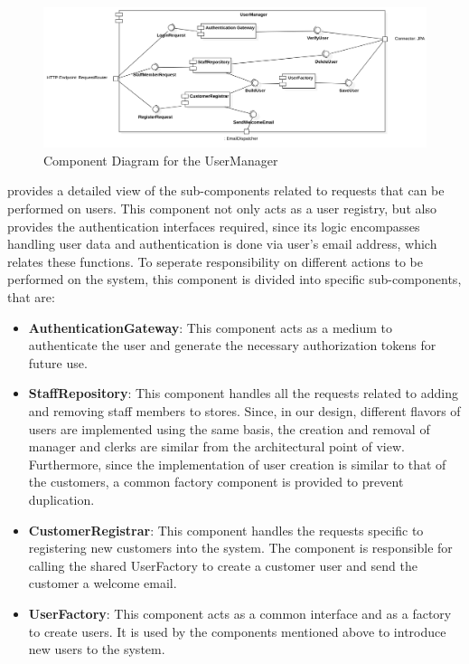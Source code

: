 \begin{figure}[H]
\centering
\includegraphics[height=0.4\textwidth]{Images/ComponentDiagrams/UserManager.png}
\caption{Component Diagram for the UserManager}
\label{fig:CDUserManager}
\end{figure}
 provides a detailed view of the sub-components related to requests that can be performed on users.
This component not only acts as a user registry, but also provides the authentication interfaces required, since its logic encompasses handling user data and authentication is done via user's email address, which relates these functions.
To seperate responsibility on different actions to be performed on the system, this component is divided into specific sub-components, that are:
\begin{itemize}
    \item \textbf{AuthenticationGateway}: This component acts as a medium to authenticate the user and generate the necessary authorization tokens for future use.
    \item \textbf{StaffRepository}: This component handles all the requests related to adding and removing staff members to stores.
    Since, in our design, different flavors of users are implemented using the same basis, the creation and removal of manager and clerks are similar from the architectural point of view.
    Furthermore, since the implementation of user creation is similar to that of the customers, a common factory component is provided to prevent duplication.
    \item \textbf{CustomerRegistrar}: This component handles the requests specific to registering new customers into the system.
    The component is responsible for calling the shared UserFactory to create a customer user and send the customer a welcome email.
    \item \textbf{UserFactory}: This component acts as a common interface and as a factory to create users.
    It is used by the components mentioned above to introduce new users to the system.
\end{itemize}
